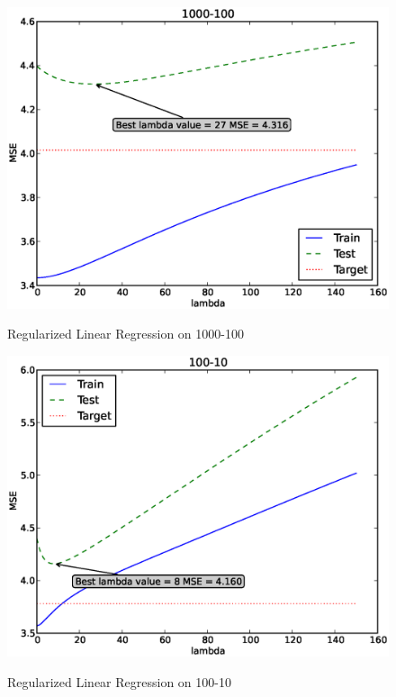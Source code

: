 \documentclass[12pt]{article}
\begin{document}
\begin{figure}[h]
\includegraphics[height=.5\textheight]{1/1000-100.eps}
\label{fig:1-1000-100}
\caption{Regularized Linear Regression on 1000-100}
\end{figure}

\begin{figure}[h]
\includegraphics[height=.5\textheight]{1/100-10.eps}
\label{fig:1-100-10}
\caption{Regularized Linear Regression on 100-10}
\end{figure}
\end{document}
